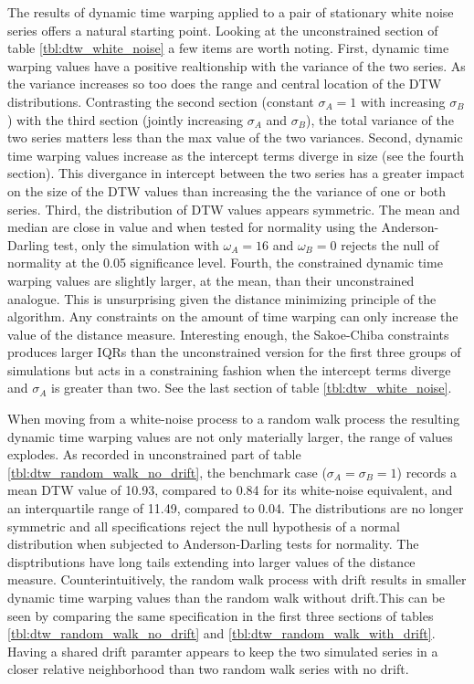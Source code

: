 \documentclass[12pt]{article}
\begin{document}
The results of dynamic time warping applied to a pair of stationary white noise series offers a natural starting point. Looking at the unconstrained section of table \ref{tbl:dtw_white_noise} a few items are worth noting. First, dynamic time warping values have a positive realtionship with the variance of the two series. As the variance increases so too does the range and central location of the DTW distributions. Contrasting the second section (constant $\sigma_{A}=1$ with increasing $\sigma_{B}$) with the third section (jointly increasing $\sigma_{A}$ and $\sigma_{B}$), the total variance of the two series matters less than the max value of the two variances. Second, dynamic time warping values increase as the intercept terms diverge in size (see the fourth section). This divergance in intercept between the two series has a greater impact on the size of the DTW values than increasing the the variance of one or both series. Third, the distribution of DTW values appears symmetric. The mean and median are close in value and when tested for normality using the Anderson-Darling test, only the simulation with $\omega_{A}=16$ and $\omega_{B}=0$ rejects the null of normality at the 0.05 significance level. Fourth, the constrained dynamic time warping values are slightly larger, at the mean, than their unconstrained analogue. This is unsurprising given the distance minimizing principle of the algorithm. Any constraints on the amount of time warping can only increase the value of the distance measure. Interesting enough, the Sakoe-Chiba constraints produces larger IQRs than the unconstrained version for the first three groups of simulations but acts in a constraining fashion when the intercept terms diverge and $\sigma_{A}$ is greater than two. See the last section of table \ref{tbl:dtw_white_noise}.

When moving from a white-noise process to a random walk process the resulting dynamic time warping values are not only materially larger, the range of values explodes. As recorded in unconstrained part of table \ref{tbl:dtw_random_walk_no_drift}, the benchmark case ($\sigma_{A}=\sigma_{B}=1$) records a mean DTW value of 10.93, compared to 0.84 for its white-noise equivalent, and an interquartile range of 11.49, compared to 0.04. The distributions are no longer symmetric and all specifications reject the null hypothesis of a normal distribution when subjected to Anderson-Darling tests for normality. The disptributions have long tails extending into larger values of the distance measure. Counterintuitively, the random walk process with drift results in smaller dynamic time warping values than the random walk without drift.This can be seen by comparing the same specification in the first three sections of tables \ref{tbl:dtw_random_walk_no_drift} and \ref{tbl:dtw_random_walk_with_drift}. Having a shared drift paramter appears to keep the two simulated series in a closer relative neighborhood than two random walk series with no drift.
\end{document}
